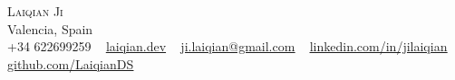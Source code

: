 \begin{center}
    {\Huge \scshape Laiqian Ji} \\ \vspace{1pt}
    Valencia, Spain \\ \vspace{1pt}
    \small +34 622699259 ~
    \href{https://laiqian.dev}{\underline{laiqian.dev}} ~
    \href{mailto:ji.laiqian@gmail.com}{\underline{ji.laiqian@gmail.com}} ~
    \href{https://linkedin.com/in/jilaiqian/}{\underline{linkedin.com/in/jilaiqian}} ~
    \href{https://github.com/LaiqianDS}{\underline{github.com/LaiqianDS}}
    \vspace{-8pt}
\end{center}
